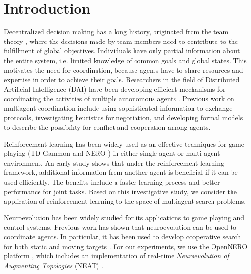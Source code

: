 \documentclass[conference]{IEEEtran}
\begin{document}
\section{Introduction}


Decentralized decision making has a long history, originated from the team
theory \cite{marschak1955elements, radner1962team,
    radner1959application, ho1972team, tsitsiklis1985complexity},
where the decisions made by team members need to contribute to the fulfillment
of global objectives. Individuals have only partial
information about the entire system, i.e. limited knowledge of common goals
and global states. This motivates the need for coordination, because agents
have to share resources and expertise in order to achieve their goals.
Researchers in the field of Distributed Artificial Intelligence (DAI) have
been developing efficient mechanisms for coordinating the activities of multiple
autonomous agents \cite{weiss1999multiagent, huhns2012distributed}. 
Previous work on multiagent coordination 
include using sophisticated information to exchange protocols, investigating
heuristics for negotiation, and developing formal models to describe the
possibility for conflict and cooperation among agents. 

Reinforcement learning has been widely used as an effective techniques for
game playing (TD-Gammon \cite{tesauro1994td} and NERO
\cite{stanley2005real}) in either single-agent or multi-agent environment. 
An early study \cite{tan1993multi} shows that under the reinforcement learning
framework, additional information from another agent is beneficial if it
can be used efficiently. The benefits include a faster learning process and better performance for joint tasks.  
Based on this investigative study, we consider the application of reinforcement learning to the space of multiagent search problems.

Neuroevolution has been widely studied for its applications to game playing and control systems. Previous work has shown that neuroevolution can be used to coordinate agents. In particular, it has been used to develop cooperative search for both static and moving targets \cite{yong2001cooperative, rajagopalan2011role, rawal2010coevolution}.
For our experiments, we use the OpenNERO platform \cite{karpov2008opennero}, which includes an implementation of real-time \textit{Neuroevolution of Augmenting Topologies} (NEAT) \cite{stanley2005real}. 
\end{document}
